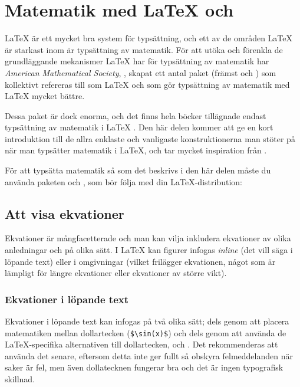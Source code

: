 \documentclass[../../a4.tex]{subfiles}
\begin{document}
\section{Matematik med \LaTeX{} och \AmS}\label{sec:3}
\LaTeX{} är ett mycket bra system för typsättning, och ett av de områden
\LaTeX{} är starkast inom är typsättning av matematik. För att utöka och
förenkla de grundläggande mekanismer \LaTeX{} har för typsättning av 
matematik har \textit{American Mathematical Society}, \AmS, skapat ett 
antal paket (främst  och ) som kollektivt 
refereras till som \AmS\LaTeX{} och som gör typsättning av matematik med 
\LaTeX{} mycket bättre.

Dessa paket är dock enorma, och det finns hela böcker tillägnade endast
typsättning av matematik i \LaTeX{} .
Den här delen kommer att ge en kort introduktion till de allra enklaste
och vanligaste konstruktionerna man stöter på när man typsätter matematik
i \LaTeX, och tar mycket inspiration från .

För att typsätta matematik så som det beskrivs i den här delen måste du
använda paketen  och , som bör följa med din
\LaTeX-distribution:
\begin{latexcode}
\usepackage{amsmath}
\usepackage{amssymb}
\end{latexcode}

\subsection{Att visa ekvationer}
Ekvationer är mångfacetterade och man kan vilja inkludera ekvationer av
olika anledningar och på olika sätt. I \LaTeX{} kan figurer infogas
\emph{inline} (det vill säga i löpande text) eller i omgivningar (vilket
frilägger ekvationen, något som är lämpligt för längre ekvationer eller
ekvationer av större vikt).

\subsubsection{Ekvationer i löpande text}
Ekvationer i löpande text kan infogas på två olika sätt; dels genom att
placera matematiken mellan dollartecken (\verb|$\sin(x)$|) och dels genom
att använda de \LaTeX-specifika alternativen till dollartecken, \cmd{(}
och \cmd{)}. Det rekommenderas att använda det senare, eftersom detta inte
ger fullt så obskyra felmeddelanden när saker är fel, men även
dollatecknen fungerar bra och det är ingen typografisk skillnad.
\end{document}
